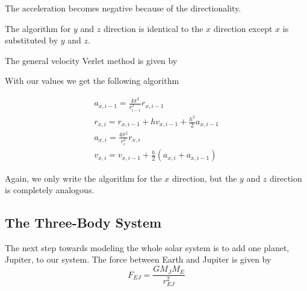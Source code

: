 \documentclass{article}
\begin{document}
\vskip0.5cm
\begin{algorithm}[H]
\end{algorithm}
\vskip0.5cm
The acceleration becomes negative because of the directionality.

The algorithm for $y$ and $z$ direction is identical to the $x$ direction except $x$ is substituted by $y$ and $z$.

\vskip0.7cm
The general velocity Verlet method is given by

\vskip0.5cm
\begin{algorithm}[H]
\end{algorithm}
\vskip0.5cm

With our values we get the following algorithm

\begin{equation*}
\begin{split}
a_{x,i-1}=\frac{4\pi^2}{r_{i-1}^3}r_{x,i-1}\\
r_{x,i}=r_{x,i-1}+hv_{x,i-1}+\frac{h^2}{2}a_{x,i-1}\\
a_{x,i}=\frac{4\pi^2}{r_i^3}r_{x,i}\\
v_{x,i}=v_{x,i-1}+\frac{h}{2}(a_{x,i}+a_{x,i-1})
\end{split}
\end{equation*}

\vskip0.5cm
\begin{algorithm}[H]
\end{algorithm}
\vskip0.5cm


Again, we only write the algorithm for the $x$ direction, but the $y$ and $z$ direction is completely analogous.


\subsection{The Three-Body System}

The next step towards modeling the whole solar system is to add one planet, Jupiter, to our system. The force between Earth and Jupiter is given by
$$F_{EJ}=\frac{GM_JM_E}{r_{EJ}^2}$$
\end{document}
